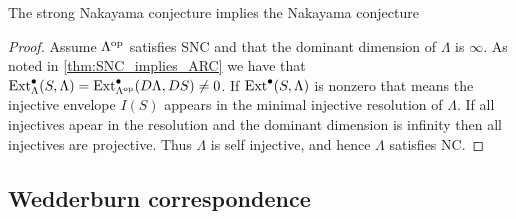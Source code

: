 \begin{prop}\cite{AR75} 
	The strong Nakayama conjecture implies the Nakayama conjecture
	\begin{proof}
		Assume $\Lambda^{\operatorname{op}}$ satisfies SNC and that the dominant dimension of $\Lambda$ is $\infty$. As noted in \cref{thm:SNC_implies_ARC} we have that $\operatorname{Ext}_\Lambda^\bullet(S, \Lambda) = \operatorname{Ext}_{\Lambda^{\operatorname{op}}}^\bullet(D\Lambda, DS) \neq 0 $. If $\operatorname{Ext}^\bullet(S, \Lambda)$ is nonzero that means the injective envelope $I(S)$ appears in the minimal injective resolution of $\Lambda$. If all injectives apear in the resolution and the dominant dimension is infinity then all injectives are projective. Thus $\Lambda$ is self injective, and hence $\Lambda$ satisfies NC. 
	\end{proof}
\end{prop}


\subsection{Wedderburn correspondence}\label{sec:wedderburn_correspondence}

